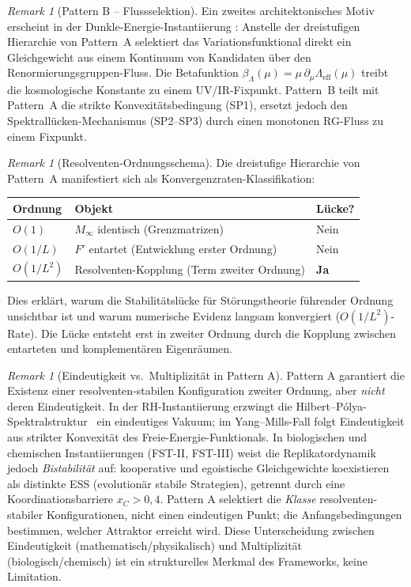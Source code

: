 \documentclass[12pt,a4paper]{article}
\theoremstyle{definition}
\theoremstyle{remark}
\newtheorem{remark}[theorem]{Remark}
\begin{document}
\begin{remark}[Pattern B -- Flussselektion]\label{rem:pattern-b}
Ein zweites architektonisches Motiv erscheint in der Dunkle-Energie-Instantiierung \cite{Geiger2026-DE}: Anstelle der dreistufigen Hierarchie von Pattern~A selektiert das Variationsfunktional direkt ein Gleichgewicht aus einem Kontinuum von Kandidaten über den Renormierungsgruppen-Fluss. Die Betafunktion $\beta_\Lambda(\mu) = \mu\,\partial_\mu \Lambda_{\mathrm{eff}}(\mu)$ treibt die kosmologische Konstante zu einem UV/IR-Fixpunkt. Pattern~B teilt mit Pattern~A die strikte Konvexitätsbedingung (SP1), ersetzt jedoch den Spektrallücken-Mechanismus (SP2--SP3) durch einen monotonen RG-Fluss zu einem Fixpunkt.
\end{remark}

\begin{remark}[Resolventen-Ordnungsschema]
\label{rem:order-schema}
Die dreistufige Hierarchie von Pattern~A manifestiert sich als Konvergenzraten-Klassifikation:
\medskip

\begin{center}
\begin{tabular}{lll}
\hline
\textbf{Ordnung} & \textbf{Objekt} & \textbf{Lücke?} \\
\hline
$O(1)$       & $M_\infty$ identisch (Grenzmatrizen) & Nein \\
$O(1/L)$     & $F'$ entartet (Entwicklung erster Ordnung) & Nein \\
$O(1/L^2)$   & Resolventen-Kopplung (Term zweiter Ordnung) & \textbf{Ja} \\
\hline
\end{tabular}
\end{center}

\medskip
\noindent
Dies erklärt, warum die Stabilitätslücke für Störungstheorie führender Ordnung unsichtbar ist und warum numerische Evidenz langsam konvergiert ($O(1/L^2)$-Rate). Die Lücke entsteht erst in zweiter Ordnung durch die Kopplung zwischen entarteten und komplementären Eigenräumen.
\end{remark}

\begin{remark}[Eindeutigkeit vs.\ Multiplizität in Pattern A]
\label{rem:uniqueness-multiplicity}
Pattern A garantiert die Existenz einer resolventen-stabilen Konfiguration zweiter Ordnung, aber \textit{nicht} deren Eindeutigkeit. In der RH-Instantiierung erzwingt die Hilbert--P\'olya-Spektralstruktur~\cite{Conrey2003} ein eindeutiges Vakuum; im Yang--Mills-Fall folgt Eindeutigkeit aus strikter Konvexität des Freie-Energie-Funktionals. In biologischen und chemischen Instantiierungen (FST-II, FST-III) weist die Replikatordynamik jedoch \textit{Bistabilität} auf: kooperative und egoistische Gleichgewichte koexistieren als distinkte ESS (evolutionär stabile Strategien), getrennt durch eine Koordinationsbarriere $x_C > 0{,}4$. Pattern A selektiert die \textit{Klasse} resolventen-stabiler Konfigurationen, nicht einen eindeutigen Punkt; die Anfangsbedingungen bestimmen, welcher Attraktor erreicht wird. Diese Unterscheidung zwischen Eindeutigkeit (mathematisch/physikalisch) und Multiplizität (biologisch/chemisch) ist ein strukturelles Merkmal des Frameworks, keine Limitation.
\end{remark}
\end{document}
